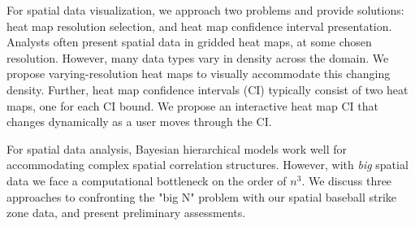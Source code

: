 \indent For spatial data visualization, we approach two problems and provide solutions: heat map resolution selection, and heat map confidence interval presentation. Analysts often present spatial data in gridded heat maps, at some chosen resolution. However, many data types vary in density across the domain. We propose varying-resolution heat maps to visually accommodate this changing density. Further, heat map confidence intervals (CI) typically consist of two heat maps, one for each CI bound. We propose an interactive heat map CI that changes dynamically as a user moves through the CI.

For spatial data analysis, Bayesian hierarchical models work well for accommodating complex spatial correlation structures. However, with {\it big} spatial data we face a computational bottleneck on the order of $n^{3}$. We discuss three approaches to confronting the "big N" problem with our spatial baseball strike zone data, and present preliminary assessments.



